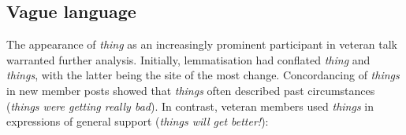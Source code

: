 \subsection{Vague language} 

The appearance of \emph{thing} as an increasingly prominent participant in veteran talk warranted further analysis. Initially, lemmatisation had conflated \emph{thing} and \emph{things}, with the latter being the site of the most change. Concordancing of \emph{things} in new \gls{member} \glspl{post} showed that \emph{things} often described past circumstances (\emph{things were getting really bad}). In contrast, veteran \glspl{member} used \emph{things} in expressions of general support (\emph{things will get better!}): %


